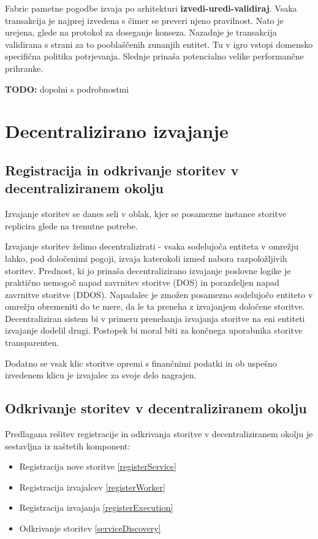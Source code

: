 \documentclass[a4paper, 12pt]{book}
\begin{document}
Fabric pametne pogodbe izvaja po arhitekturi \textbf{izvedi-uredi-validiraj}.
Vsaka transakcija je najprej izvedena s čimer se preveri njeno pravilnost.
Nato je urejena, glede na protokol za doseganje konseza.
Nazadnje je transakcija validirana s strani za to pooblaščenih zunanjih entitet.
Tu v igro vstopi domensko specifična politika potrjevanja.
Slednje prinaša potencialno velike performančne prihranke.

\textbf{TODO:} dopolni s podrobnostmi

\chapter{Decentralizirano izvajanje}
\label{ch4}

\section{Registracija in odkrivanje storitev v decentraliziranem okolju}

Izvajanje storitev se danes seli v oblak, kjer se posamezne instance storitve replicira glede na trenutne potrebe.

Izvajanje storitev želimo decentralizirati - vsaka sodelujoča entiteta v omrežju lahko, pod določenimi pogoji, izvaja
katerokoli izmed nabora razpoložljivih storitev.
Prednost, ki jo prinaša decentralizirano izvajanje poslovne logike je praktično nemogoč napad zavrnitev storitve (DOS) in
porazdeljen napad zavrnitve storitve (DDOS).
Napadalec je zmožen posamezno sodelujočo entiteto v omrežju obremeniti do te mere, da le ta preneha z izvajanjem določene storitve.
Decentraliziran sistem bi v primeru prenehanja izvajanja storitve na eni entiteti izvajanje dodelil drugi. Postopek bi moral biti za končnega uporabnika storitve transparenten.

Dodatno se vsak klic storitve opremi s finančnimi podatki in ob uspešno izvedenem klicu je izvajalec za svoje delo nagrajen.

\section{Odkrivanje storitev v decentraliziranem okolju}
Predlagana rešitev registracije in odkrivanja storitve v decentraliziranem okolju je sestavljna iz naštetih komponent:
\begin{itemize}
	\item Registracija nove storitve \ref{registerService}
	\item Registracija izvajalcev \ref{registerWorker}
	\item Registracija izvajanja \ref{registerExecution}
	\item Odkrivanje storitev \ref{serviceDiscovery}
\end{itemize}
\end{document}

